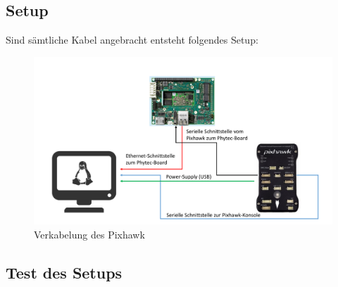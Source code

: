 \documentclass[12pt]{article} %
\begin{document}
	\subsection{Setup} \label{Setup}
	
	Sind sämtliche Kabel angebracht entsteht folgendes Setup:
	
	\begin{figure}[H]
		\centering
		\includegraphics[scale=0.7]{Setup}
		\caption{Verkabelung des Pixhawk}
		\label{2}
	\end{figure}
	
	\subsection{Test des Setups}
	
\end{document}
